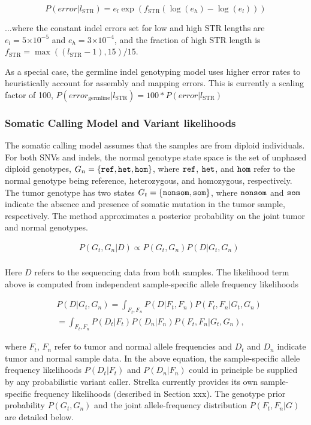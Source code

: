 \documentclass{article}
\newcommand{\e}[1]{\ensuremath{\times 10^{#1}}}
\begin{document}
\begin{equation*}
P(error | l_{\text{STR}}) = e_{l} \exp(f_{\text{STR}}(\log(e_{h})-\log(e_{l})))
\end{equation*}

\noindent ...where the constant indel errors set for low and high STR lengths are $e_{l} = 5\e{-5}$ and $e_{h} = 3\e{-4}$, and the fraction of high STR length is $f_{\text{STR}} = \max((l_{\text{STR}}-1),15)/15$.

As a special case, the germline indel genotyping model uses higher error rates to heuristically account for assembly and mapping errors. This is currently a scaling factor of 100, $P(error_{\text{germline}} | l_{\text{STR}}) = 100 * P(error | l_{\text{STR}})$


\subsubsection{Somatic Calling Model and Variant likelihoods}

The somatic calling model assumes that the samples are from diploid individuals. For both SNVs and indels, the normal genotype state space is the set of unphased diploid genotypes, $G_n = \{ \tt{ref}, \tt{het}, \tt{hom}\}$, where $\tt{ref}$, $\tt{het}$, and $\tt{hom}$ refer to the normal genotype being reference, heterozygous, and homozygous, respectively. The tumor genotype has two states $G_t = \{ \tt{nonsom}, \tt{som} \}$, where $\tt{nonsom}$ and $\tt{som}$ indicate the absence and presence of somatic mutation in the tumor sample, respectively. The method approximates a posterior probability on the joint tumor and normal genotypes.

\begin{align*}
	& P(G_t,G_n|D) \propto P(G_t,G_n) P(D|G_t,G_n) \\
\end{align*}


Here $D$ refers to the sequencing data from both samples. The likelihood term above is computed from independent sample-specific allele frequency likelihoods

\begin{align*}
	& P(D|G_t,G_n) = \int_{F_t,F_n}{P(D|F_t,F_n)P(F_t,F_n|G_t,G_n)} \\
	& = \int_{F_t,F_n}{P(D_t|F_t)P(D_n|F_n)P(F_t,F_n|G_t,G_n)},
\end{align*}

\noindent where $F_t$, $F_n$ refer to tumor and normal allele frequencies and $D_t$ and $D_n$ indicate tumor and normal sample data. In the above equation, the sample-specific allele frequency likelihoods $P(D_t|F_t)$ and $P(D_n|F_n)$ could in principle be supplied by any probabilistic variant caller. Strelka currently provides its own sample-specific frequency likelihoods (described in Section xxx). The genotype prior probability $P(G_t, G_n)$ and the joint allele-frequency distribution $P(F_t,F_n|G)$ are detailed below.
\end{document}

